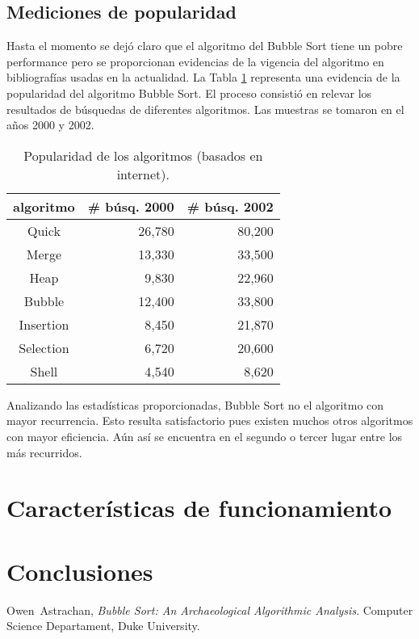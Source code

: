 \documentclass[conference]{IEEEtran}
\begin{document}
\subsection{Mediciones de popularidad}
\label{sec:orig-med-pop}

Hasta el momento se dejó claro que el algoritmo del Bubble Sort tiene
un pobre performance pero se proporcionan evidencias de la vigencia
del algoritmo en bibliografías usadas en la actualidad. La Tabla
\ref{tab:pop} representa una evidencia de la popularidad del algoritmo
Bubble Sort. El proceso consistió en relevar los resultados de
búsquedas de diferentes algoritmos. Las muestras se tomaron en el años
2000 y 2002. 
\begin{table}[!t]
\renewcommand{\arraystretch}{1.3}
\caption{Popularidad de los algoritmos (basados en internet).}
\label{tab:pop}
\centering
\begin{tabular}{|c|r|r|}
\hline
\textbf{algoritmo} & \textbf{\# búsq. 2000} & \textbf{\# búsq. 2002} \\
\hline
Quick     & 26,780 & 80,200 \\
Merge     & 13,330 & 33,500 \\
Heap      & 9,830  & 22,960 \\
Bubble    & 12,400 & 33,800 \\
Insertion & 8,450  & 21,870 \\
Selection & 6,720  & 20,600 \\
Shell     & 4,540  & 8,620  \\
\hline
\end{tabular}
\end{table}

Analizando las estadísticas proporcionadas, Bubble Sort no el
algoritmo con mayor recurrencia. Esto resulta satisfactorio pues
existen muchos otros algoritmos con mayor eficiencia. Aún así se
encuentra en el segundo o tercer lugar entre los más recurridos. 


\section{Características de funcionamiento}
\label{sec:car-func}

\section{Conclusiones}
\label{sec:conc}


\begin{thebibliography}{1}
  Owen~Astrachan, \emph{Bubble Sort: An Archaeological Algorithmic
    Analysis}. Computer Science Departament, Duke University. 
\end{thebibliography}

\end{document}
